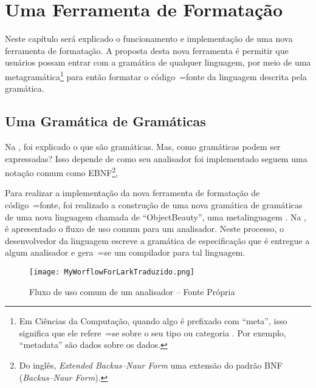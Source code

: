 

\chapter{Uma Ferramenta de Formatação}
\label{software_implementation}

Neste capítulo será explicado o funcionamento e
implementação de uma nova ferramenta de formatação.
A proposta desta nova ferramenta é permitir que usuários possam entrar com a gramática de qualquer linguagem,
por meio de uma metagramática\footnote{
Em Ciências da Computação,
quando algo é prefixado com ``meta'',
isso significa que ele refere~=se sobre o seu tipo ou
categoria \cite{theUseOfMetaRules}.
Por exemplo,
``metadata'' são dados sobre os dados.
} para então formatar o código~=fonte da linguagem descrita pela gramática.


\section{Uma Gramática de Gramáticas}

Na ,
foi explicado o que são gramáticas.
Mas,
como gramáticas podem ser expressadas?
Isso depende de como seu analisador foi implementado  seguem uma notação comum como EBNF\footnote{
Do inglês,
\textit{Extended Backus–Naur Form} uma extensão do padrão BNF (\textit{Backus–Naur Form}).
}\cite{teachingEbnf,antlrBookTerrentParr},

Para realizar a implementação da nova ferramenta de formatação de código~=fonte,
foi realizado a construção de uma nova gramática de gramáticas de uma nova linguagem chamada de ``ObjectBeauty'',
uma metalinguagem \cite{compilersCompilerMetaLanguage}.
Na ,
é apresentado o fluxo de uso comum para um analisador.
Neste processo,
o desenvolvedor da linguagem escreve a gramática de especificação que é entregue a algum analisador e
gera~=se um compilador para tal linguagem.
\begin{figure}[h]
\centering
\texttt{[image: MyWorflowForLarkTraduzido.png]}
\caption[Fluxo de uso comum de um analisador]{Fluxo de uso comum de um analisador -- Fonte Própria \cite{larkErrorRecovery}}
\label{MyWorflowForLarkTraduzido}
\end{figure}

